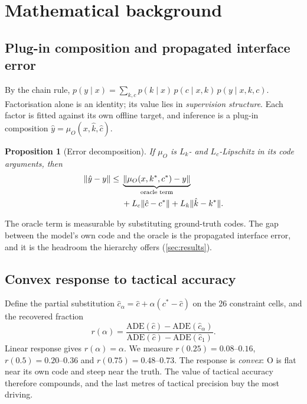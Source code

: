 \documentclass[10pt,twocolumn]{article}
\newtheorem{proposition}{Proposition}
\theoremstyle{remark}
\newcommand{\ADE}{\mathrm{ADE}}
\begin{document}
\section{Mathematical background}\label{sec:math}

\subsection{Plug-in composition and propagated interface error}
By the chain rule, $p(y\mid x)=\sum_{k,c}p(k\mid x)\,p(c\mid x,k)\,p(y\mid x,k,c)$. Factorisation alone is an identity; its value lies in
\emph{supervision structure}. Each factor is fitted against its own offline target, and inference is a plug-in composition
$\hat y=\mu_O(x,\hat k,\hat c)$.
\begin{proposition}[Error decomposition]\label{prop:lip}
If $\mu_O$ is $L_k$- and $L_c$-Lipschitz in its code arguments, then
\begin{equation}
\begin{aligned}
\|\hat y-y\|\le{}&\underbrace{\|\mu_O(x,k^\ast,c^\ast)-y\|}_{\textup{oracle term}}\\
&+L_c\|\hat c-c^\ast\|+L_k\|\hat k-k^\ast\| .
\end{aligned}
\end{equation}
\end{proposition}
\noindent The oracle term is measurable by substituting ground-truth codes. The gap between the model's own code and the oracle is
the propagated interface error, and it is the headroom the hierarchy offers (\cref{sec:results}).

\subsection{Convex response to tactical accuracy}
Define the partial substitution $\hat c_\alpha=\hat c+\alpha(c^\ast-\hat c)$ on the 26 constraint cells, and the recovered fraction
\begin{equation}
r(\alpha)=\frac{\ADE(\hat c)-\ADE(\hat c_\alpha)}{\ADE(\hat c)-\ADE(\hat c_1)} .
\end{equation}
Linear response gives $r(\alpha)=\alpha$. We measure $r(0.25)=0.08$--$0.16$, $r(0.5)=0.20$--$0.36$ and $r(0.75)=0.48$--$0.73$. The
response is \emph{convex}: O is flat near its own code and steep near the truth. The value of tactical accuracy therefore compounds,
and the last metres of tactical precision buy the most driving.
\end{document}
